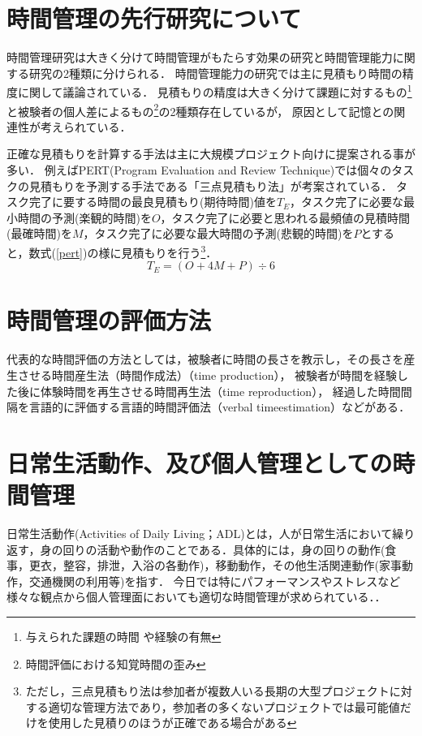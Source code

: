 \section{時間管理の先行研究について}
時間管理研究は大きく分けて時間管理がもたらす効果の研究と時間管理能力に関する研究の2種類に分けられる．
時間管理能力の研究では主に見積もり時間の精度に関して議論されている．
見積もりの精度は大きく分けて課題に対するもの\footnote{与えられた課題の時間 \cite{Roy2008}や経験の有無\cite{Roy2007}}と被験者の個人差によるもの\footnote{時間評価における知覚時間の歪み\cite{Oguro1961}\cite{Murakami2016}}の2種類存在しているが，
原因として記憶との関連性が考えられている\cite{Roy2005}．

正確な見積もりを計算する手法は主に大規模プロジェクト向けに提案される事が多い．
例えばPERT(Program Evaluation and Review Technique)では個々のタスクの見積もりを予測する手法である「三点見積もり法」が考案されている．
タスク完了に要する時間の最良見積もり(期待時間)値を$T_{E}$，タスク完了に必要な最小時間の予測(楽観的時間)を$O$，タスク完了に必要と思われる最頻値の見積時間(最確時間)を$M$，タスク完了に必要な最大時間の予測(悲観的時間)を$P$とすると，数式(\ref{pert})の様に見積もりを行う\footnote{ただし，三点見積もり法は参加者が複数人いる長期の大型プロジェクトに対する適切な管理方法であり，参加者の多くないプロジェクトでは最可能値だけを使用した見積りのほうが正確である場合がある\cite{Kato1965}}．
\begin{equation}
\label{pert}
T_{E} = (O + 4M + P) ÷ 6
\end{equation}

\section{時間管理の評価方法}
代表的な時間評価の方法としては，被験者に時間の長さを教示し，その長さを産生させる時間産生法（時間作成法）（time production），
被験者が時間を経験した後に体験時間を再生させる時間再生法（time reproduction），
経過した時間間隔を言語的に評価する言語的時間評価法（verbal timeestimation）などがある\cite{Oguro1961}\cite{Tayama2018}．

\section{日常生活動作、及び個人管理としての時間管理}
日常生活動作(Activities of Daily Living；ADL)とは，人が日常生活において繰り返す，身の回りの活動や動作のことである．具体的には，身の回りの動作(食事，更衣，整容，排泄，入浴の各動作)，移動動作，その他生活関連動作(家事動作，交通機関の利用等)を指す\cite{Sakai2003}．
今日では特にパフォーマンスやストレスなど様々な観点から個人管理面においても適切な時間管理が求められている．\cite{Barling1996}\cite{Britton1991}\cite{Burt1994}\cite{Macan1994}．

